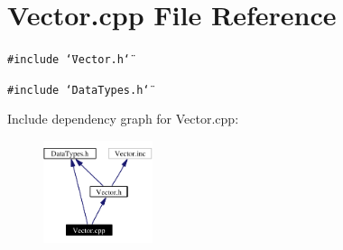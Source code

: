 \section{Vector.cpp File Reference}
\label{Vector_8cpp}
{\tt \#include \char`\"{}Vector.h\char`\"{}}\par
{\tt \#include \char`\"{}Data\-Types.h\char`\"{}}\par


Include dependency graph for Vector.cpp:\begin{figure}[H]
\begin{center}
\leavevmode
\includegraphics[width=91pt]{Vector_8cpp__incl}
\end{center}
\end{figure}

